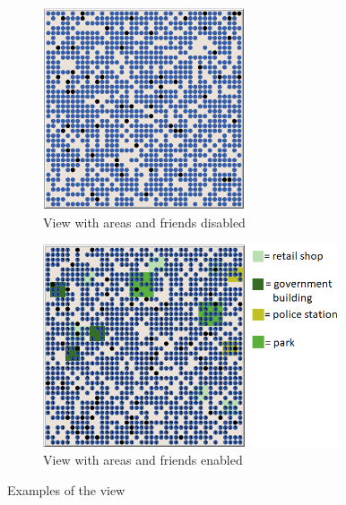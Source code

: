 \documentclass[a4paper,11pt]{article}
\begin{document}
\begin{figure}[h]
 \begin{subfigure}{0.4\textwidth}
 \centering
  \includegraphics[width=0.8\linewidth, height=6cm]{NormalExample.PNG} 
  \caption{View with areas and friends disabled}
  \label{fig:subimNormal}
 \end{subfigure}
 \begin{subfigure}{0.6\textwidth}
 \centering
  \includegraphics[width=0.9\linewidth, height=6cm]{CustomExample.PNG}
  \caption{View with areas and friends enabled}
  \label{fig:subimCustom}
 \end{subfigure}
 \caption{Examples of the view}
 \label{fig:ViewExample}
\end{figure}
\end{document}
